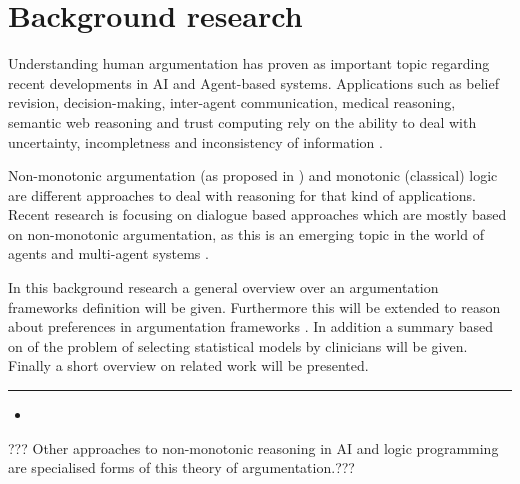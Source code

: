 \section{Background research}

Understanding human argumentation has proven as important topic regarding recent developments in \Gls{AI} and Agent-based systems. Applications such as belief revision, decision-making, inter-agent communication, medical reasoning, semantic web reasoning and trust computing rely on the ability to deal with uncertainty, incompletness and inconsistency of information \cite{liao,Bench2007}.

Non-monotonic argumentation (as proposed in \cite{dung1995, liao}) and monotonic (classical) logic \cite{Reiter1980} are different approaches to deal with reasoning for that kind of applications. Recent research is focusing on dialogue based approaches which are mostly based on non-monotonic argumentation, as this is an emerging topic in the world of agents and multi-agent systems \cite{parsons2000,Walton1995}.

In this background research a general overview over an argumentation frameworks definition will be given. Furthermore this will be extended to reason about preferences in argumentation frameworks \cite{Modgil2009}. In addition a summary based on \cite{sassoon2014} of the problem of selecting statistical models by clinicians will be given. Finally a short overview on related work will be presented.





\bigskip
\hrule	
\bigskip



\begin{itemize}
	\item {}
\end{itemize}


??? Other approaches to non-monotonic reasoning in \Gls{AI} and logic programming are specialised forms of this theory of argumentation.???


